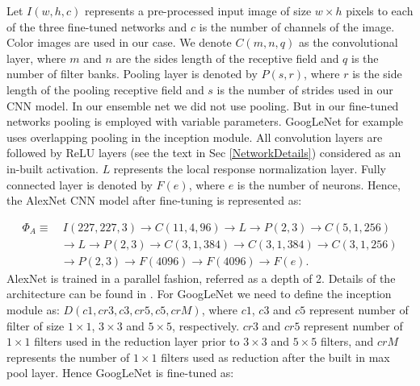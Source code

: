\documentclass[journal]{IEEEtran}%
\begin{document}
Let $I(w,h,c)$ represents a pre-processed input image of size $w\times h$ pixels to each of the three fine-tuned networks and $c$ is the number of channels of the image. Color images are used in our case. We denote $C(m,n,q)$ as the convolutional layer, where $m$ and $n$ are the sides length of the receptive field and $q$ is the number of filter banks. Pooling layer is denoted by $P(s,r)$, where $r$ is the side length of the pooling receptive field and $s$ is the number of strides used in our CNN model. In our ensemble net we did not use pooling. But in our fine-tuned networks pooling is employed with variable parameters. GoogLeNet for example uses overlapping pooling in the inception module. All convolution layers are followed by ReLU layers (see the text in Sec \ref{NetworkDetails}) considered as an in-built activation. $L$ represents the local response normalization layer. Fully connected layer is denoted by $F(e)$, where $e$ is the number of neurons. Hence, the AlexNet CNN model after fine-tuning is represented as:

{\tiny
\begin{equation}\label{AlexNet}
\begin{aligned}
\Phi_A \equiv & ~I(227,227,3) \longrightarrow C(11,4,96) \longrightarrow L \longrightarrow P(2,3)
\longrightarrow C(5,1,256) \\
& \longrightarrow L \longrightarrow P(2,3) \longrightarrow C(3,1,384) \longrightarrow C(3,1,384) \longrightarrow C(3,1,256) \\
&  \longrightarrow P(2,3) \longrightarrow F(4096) \longrightarrow F(4096)  \longrightarrow F(e).
\end{aligned}
\end{equation}
}
AlexNet is trained in a parallel fashion, referred as a depth of 2. Details of the architecture can be found in \cite{Krizhevsky1}. For GoogLeNet we need to define the inception module as: $D(c1, cr3, c3, cr5, c5, crM)$, where $c1$, $c3$ and $c5$ represent number of filter of size $1\times1$, $3\times3$ and $5\times5$, respectively. $cr3$ and $cr5$ represent number of $1\times1$ filters used in the reduction layer prior to $3\times3$ and $5\times5$ filters, and $crM$ represents the number of $1\times1$ filters used as reduction after the built in max pool layer. Hence GoogLeNet is fine-tuned as:
\end{document}
